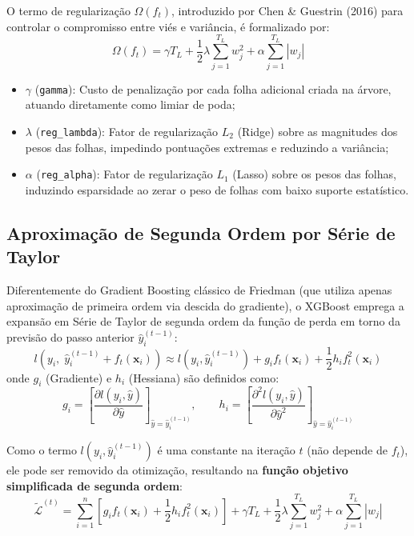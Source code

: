 \documentclass[11pt,a4paper]{article}
\begin{document}
O termo de regularização $\Omega(f_t)$, introduzido por Chen \& Guestrin (2016) para controlar o compromisso entre viés e variância, é formalizado por:
\begin{equation}
  \Omega(f_t) = \gamma T_L + \frac{1}{2} \lambda \sum_{j=1}^{T_L} w_j^2 + \alpha \sum_{j=1}^{T_L} |w_j|
  \label{eq:omega_reg}
\end{equation}
\begin{itemize}
  \item $\gamma$ (\texttt{gamma}): Custo de penalização por cada folha adicional criada na árvore, atuando diretamente como limiar de poda;
  \item $\lambda$ (\texttt{reg\_lambda}): Fator de regularização $L_2$ (Ridge) sobre as magnitudes dos pesos das folhas, impedindo pontuações extremas e reduzindo a variância;
  \item $\alpha$ (\texttt{reg\_alpha}): Fator de regularização $L_1$ (Lasso) sobre os pesos das folhas, induzindo esparsidade ao zerar o peso de folhas com baixo suporte estatístico.
\end{itemize}

\subsection{Aproximação de Segunda Ordem por Série de Taylor}
Diferentemente do Gradient Boosting clássico de Friedman (que utiliza apenas aproximação de primeira ordem via descida do gradiente), o XGBoost emprega a expansão em Série de Taylor de segunda ordem da função de perda em torno da previsão do passo anterior $\hat{y}_i^{(t-1)}$:
\begin{equation}
  l\left(y_i, \; \hat{y}_i^{(t-1)} + f_t(\mathbf{x}_i)\right) \approx l\left(y_i, \hat{y}_i^{(t-1)}\right) + g_i f_t(\mathbf{x}_i) + \frac{1}{2} h_i f_t^2(\mathbf{x}_i)
  \label{eq:taylor_expansion}
\end{equation}
onde $g_i$ (Gradiente) e $h_i$ (Hessiana) são definidos como:
\begin{equation}
  g_i = \left[ \frac{\partial l(y_i, \hat{y})}{\partial \hat{y}} \right]_{\hat{y} = \hat{y}_i^{(t-1)}}, \qquad h_i = \left[ \frac{\partial^2 l(y_i, \hat{y})}{\partial \hat{y}^2} \right]_{\hat{y} = \hat{y}_i^{(t-1)}}
  \label{eq:grad_hess}
\end{equation}

Como o termo $l(y_i, \hat{y}_i^{(t-1)})$ é uma constante na iteração $t$ (não depende de $f_t$), ele pode ser removido da otimização, resultando na \textbf{função objetivo simplificada de segunda ordem}:
\begin{equation}
  \tilde{\mathcal{L}}^{(t)} = \sum_{i=1}^n \left[ g_i f_t(\mathbf{x}_i) + \frac{1}{2} h_i f_t^2(\mathbf{x}_i) \right] + \gamma T_L + \frac{1}{2} \lambda \sum_{j=1}^{T_L} w_j^2 + \alpha \sum_{j=1}^{T_L} |w_j|
  \label{eq:obj_simplificada}
\end{equation}
\end{document}
